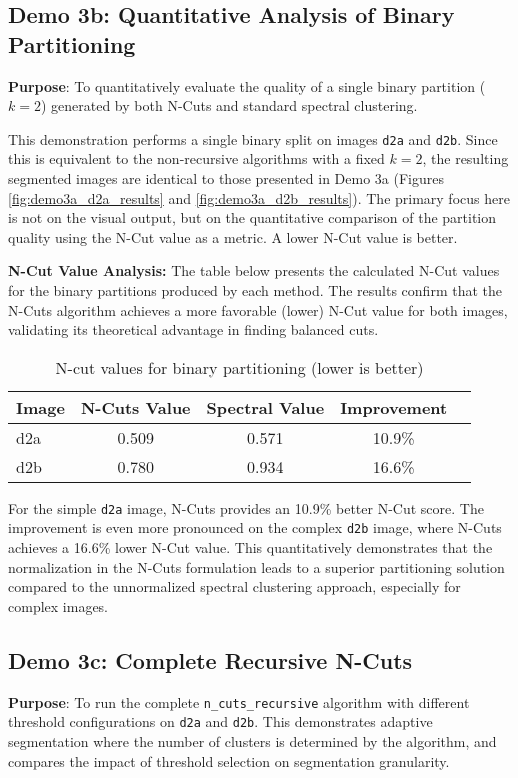 \documentclass[12pt,a4paper]{article}
\begin{document}
{\subsection{Demo 3b: Quantitative Analysis of Binary Partitioning}
\textbf{Purpose}: To quantitatively evaluate the quality of a single binary partition ($k=2$) generated by both N-Cuts and standard spectral clustering.

This demonstration performs a single binary split on images \texttt{d2a} and \texttt{d2b}. Since this is equivalent to the non-recursive algorithms with a fixed $k=2$, the resulting segmented images are identical to those presented in Demo 3a (Figures \ref{fig:demo3a_d2a_results} and \ref{fig:demo3a_d2b_results}). The primary focus here is not on the visual output, but on the quantitative comparison of the partition quality using the N-Cut value as a metric. A lower N-Cut value is better.

\textbf{N-Cut Value Analysis:}
The table below presents the calculated N-Cut values for the binary partitions produced by each method. The results confirm that the N-Cuts algorithm achieves a more favorable (lower) N-Cut value for both images, validating its theoretical advantage in finding balanced cuts.

\begin{table}[H]
\centering
\begin{tabular}{@{}lcccc@{}}
\toprule
Image & N-Cuts Value & Spectral Value & Improvement \\
\midrule
d2a & 0.509 & 0.571 & 10.9\% \\
d2b & 0.780 & 0.934 & 16.6\% \\
\bottomrule
\end{tabular}
\caption{N-cut values for binary partitioning (lower is better)}
\label{tab:demo3b}
\end{table}

For the simple \texttt{d2a} image, N-Cuts provides an 10.9\% better N-Cut score. The improvement is even more pronounced on the complex \texttt{d2b} image, where N-Cuts achieves a 16.6\% lower N-Cut value. This quantitatively demonstrates that the normalization in the N-Cuts formulation leads to a superior partitioning solution compared to the unnormalized spectral clustering approach, especially for complex images.




\subsection{Demo 3c: Complete Recursive N-Cuts}
\textbf{Purpose}: To run the complete \texttt{n\_cuts\_recursive} algorithm with different threshold configurations on \texttt{d2a} and \texttt{d2b}. This demonstrates adaptive segmentation where the number of clusters is determined by the algorithm, and compares the impact of threshold selection on segmentation granularity.


}
\end{document}
